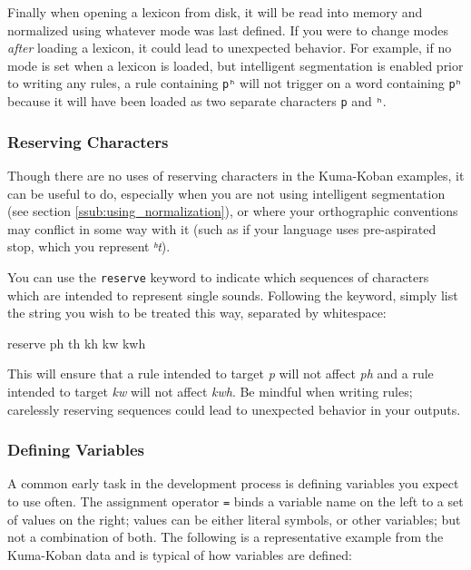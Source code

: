 \documentclass[10pt,letterpaper]{article}
\newcounter{excounter}
\newenvironment{vex}[1]{
	\vspace{1em}
	\refstepcounter{excounter}
	\noindent\makebox[3em][l]{[\arabic{excounter}\label{#1}]}
	\minipage{\textwidth}
	\verbatim
}{
	\endverbatim
	\endminipage
	\vspace{1em}
}
\begin{document}
Finally when opening a lexicon from disk, it will be read into memory and normalized using whatever mode was last defined. If you were to change modes \emph{after} loading a lexicon, it could lead to unexpected behavior. For example, if no mode is set when a lexicon is loaded, but intelligent segmentation is enabled prior to writing any rules, a rule containing \texttt{pʰ} will not trigger on a word containing \texttt{pʰ} because it will have been loaded as two separate characters \texttt{p} and \texttt{ʰ}. 


\subsubsection{Reserving Characters} 
\label{ssub:reserving_characters}
Though there are no uses of reserving characters in the Kuma-Koban examples, it can be useful to do, especially when you are not using intelligent segmentation (see section \ref{ssub:using_normalization}), or where your orthographic conventions may conflict in some way with it (such as if your language uses pre-aspirated stop, which you represent \emph{ʰt}).

You can use the \texttt{reserve} keyword to indicate which sequences of characters which are intended to represent single sounds. Following the keyword, simply list the string you wish to be treated this way, separated by whitespace:

\begin{vex}{ex:reserve}
reserve ph th kh kw kwh
\end{vex}

\noindent
This will ensure that a rule intended to target \emph{p} will not affect \emph{ph} and a rule intended to target \emph{kw} will not affect \emph{kwh}. Be mindful when writing rules; carelessly reserving sequences could lead to unexpected behavior in your outputs.


\subsubsection{Defining Variables}
\label{ssub:defining_variables}
A common early task in the development process is defining variables you expect to use often. The assignment operator \texttt{=} binds a variable name on the left to a set of values on the right; values can be either literal symbols, or other variables; but not a combination of both. The following is a representative example from the Kuma-Koban data and is typical of how variables are defined:
\end{document}

